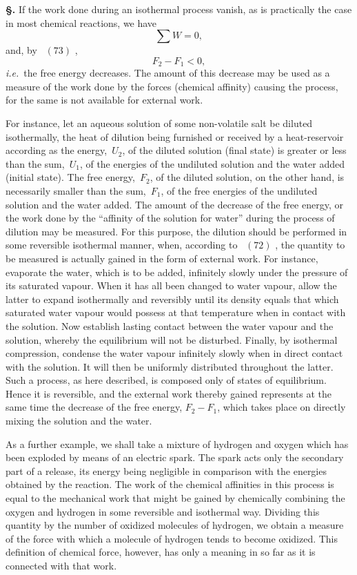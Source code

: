\documentclass[12pt]{book}[2005/09/16]
\newcommand{\Section}[1]{
  \medskip\par\textbf{§\;#1}
  \label{section:#1}
}
\newcommand{\Eq}[1]{%
  \hyperref[eqn:#1]{\ensuremath{#1}}%
}
\newcommand{\PageSep}[1]{\ignorespaces}
\newcommand{\ie}{\emph{i.e.}}
\newcommand{\tsum}{\mathop{\textstyle\sum}\limits}
\begin{document}
\Section{143.} If the work done during an isothermal process
vanish, as is practically the case in most chemical reactions,
we have
\[
\tsum W = 0,
\]
and, by~\Eq{(73)},
\[
F_{2} - F_{1} < 0,
\]
\ie\ the free energy decreases. The amount of this decrease
may be used as a measure of the work done by the forces
(chemical affinity) causing the process, for the same is not
available for external work.

For instance, let an aqueous solution of some non-volatile
\PageSep{112}
%
%
%
salt be diluted isothermally, the heat of dilution being
%
furnished or received by a heat-reservoir according as the
energy,~$U_{2}$, of the diluted solution (final state) is greater or
less than the sum,~$U_{1}$, of the energies of the undiluted
solution and the water added (initial state). The free
energy,~$F_{2}$, of the diluted solution, on the other hand, is
necessarily smaller than the sum,~$F_{1}$, of the free energies of
the undiluted solution and the water added. The amount
of the decrease of the free energy, or the work done by the
%
``affinity of the solution for water'' during the process of
dilution may be measured. For this purpose, the dilution
should be performed in some reversible isothermal manner,
when, according to~\Eq{(72)}, the quantity to be measured is
actually gained in the form of external work. For instance,
evaporate the water, which is to be added, infinitely slowly
under the pressure of its saturated vapour. When it has all
been changed to water vapour, allow the latter to expand
isothermally and reversibly until its density equals that
which saturated water vapour would possess at that temperature
when in contact with the solution. Now establish
lasting contact between the water vapour and the solution,
whereby the equilibrium will not be disturbed. Finally, by
isothermal compression, condense the water vapour infinitely
slowly when in direct contact with the solution. It will
then be uniformly distributed throughout the latter. Such
a process, as here described, is composed only of states of
equilibrium. Hence it is reversible, and the external work
thereby gained represents at the same time the decrease
of the free energy, $F_{2} - F_{1}$, which takes place on directly
mixing the solution and the water.

As a further example, we shall take a mixture of
hydrogen and oxygen which has been exploded by means
of an electric spark. The spark acts only the secondary
part of a release, its energy being negligible in comparison
with the energies obtained by the reaction. The work
of the chemical affinities in this process is equal to the
mechanical work that might be gained by chemically combining
the oxygen and hydrogen in some reversible and
\PageSep{113}
isothermal way. Dividing this quantity by the number of
oxidized molecules of hydrogen, we obtain a measure of the
force with which a molecule of hydrogen tends to become
oxidized. This definition of chemical force, however, has
only a meaning in so far as it is connected with that work.
\end{document}
